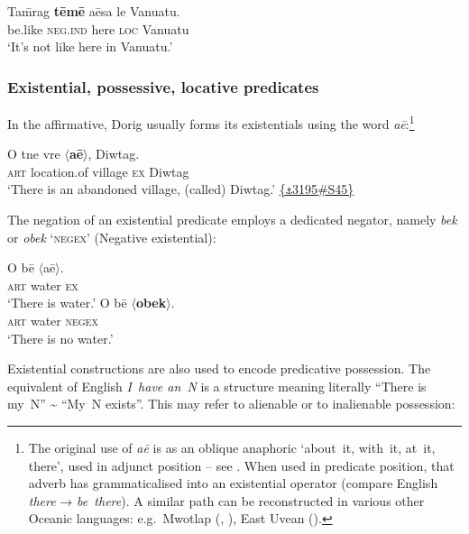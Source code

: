 \documentclass[output=paper,colorlinks,citecolor=brown,draft]{langscibook}
\begin{document}
\ea\label{ex:dor:similative}
    \gll Ta\={m}rag \textbf{tēmē} aēsa le Vanuatu.\\
        be.like \textsc{neg.ind} here \textsc{loc} Vanuatu\\
    \glt ‘It’s not like here in Vanuatu.’ \quad {\small [\textsc{af.bp3}.28a]}  
\z

\subsubsection{Existential, possessive, locative predicates}\label{sec:dor:2.3.3}

In the affirmative, Dorig usually forms its existentials using the word  \textit{aē}:\footnote{The original use of \textit{aē} is as an oblique anaphoric ‘about~it, with~it, at~it, there’, used in adjunct position – see . When used in predicate position, that adverb has grammaticalised into an existential operator (compare English \textit{there} → \textit{be~there}). A similar path can be reconstructed in various other Oceanic languages: e.g.~Mwotlap (\citealt[128]{François2005b}, \citeyear[1055]{FrançoisForthcominga}), East Uvean (\citealt[305]{MoyseFaurie2018}).}

\ea\label{ex:dor:exist}
    \gll O tne vre \textrm{${\langle}$}\textbf{aē}\textrm{${\rangle}$}, Diwtag.\\
         \textsc{art} location.of village \textsc{ex} Diwtag\\
    \glt‘There is an abandoned village, (called) Diwtag.’ \quad  \href{https://doi.org/10.24397/pangloss-0003195#S45}{\{\texttt{⚓}3195\#S45\}}
\z

The negation of an existential predicate  employs a dedicated negator, namely  \textit{bek} or \textit{obek} ‘\textsc{negex}’ (Negative existential):

\ea\label{ex:dor:bek0}
    \ea\label{ex:dor:beka}
        \gll O bē \textrm{${\langle}$}aē\textrm{${\rangle}$}. \\ 
             \textsc{art} water \textsc{ex}  \\
        \glt ‘There is water.’ 
    \ex\label{ex:dor:bekb}
        \gll  O bē \textrm{${\langle}$}\textbf{obek}\textrm{${\rangle}$}.\\
             \textsc{art} water \textsc{negex} \\
        \glt ‘There is no water.’
    \z 
\z 


Existential constructions are also used to encode predicative possession. The equivalent of English \textit{I~have an~N} is a structure meaning literally “There is my~N” {\textasciitilde} “My~N exists”. This may refer to alienable  or to inalienable  possession:
\end{document}
